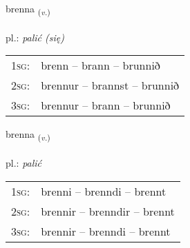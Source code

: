 \documentclass[frontgrid, backgrid]{flacards}\usepackage[]{graphicx}\usepackage[]{xcolor}
\begin{document}
\renewcommand{\flhead}{\vskip5pt \fboxsep=0pt {\small\bfseries\footnotesize Sagnorð | Verb}}
\renewcommand{\fcfoot}{\vskip5pt \fboxsep=0pt \hspace{2pt}{\small\bfseries\footnotesize 2K}}

\renewcommand{\blhead}{\vskip5pt {\small\bfseries\footnotesize Sagnorð | Verb }}
\renewcommand{\bcfoot}{\vskip5pt \hspace{2pt}{\small\bfseries\footnotesize 2K}}


{brenna \small{\textsubscript{(\textit{v.})}} \\[1ex] %
\textphonetic{[prɛna]} \\
pl.: \emph{palić (się)} \\  [2ex]
\renewcommand*{\arraystretch}{0.8}
\begin{tabular}{p{1cm}l}
\textsc{1sg}: & brenn -- brann -- brunnið \\ 
\textsc{2sg}: & brennur -- brannst -- brunnið \\ 
\textsc{3sg}: & brennur -- brann -- brunnið \\ 
\end{tabular}
}

\renewcommand{\flhead}{\vskip5pt \fboxsep=0pt {\small\bfseries\footnotesize Sagnorð | Verb}}
\renewcommand{\fcfoot}{\vskip5pt \fboxsep=0pt \hspace{2pt}{\small\bfseries\footnotesize 2K}}

\renewcommand{\blhead}{\vskip5pt {\small\bfseries\footnotesize Sagnorð | Verb }}
\renewcommand{\bcfoot}{\vskip5pt \hspace{2pt}{\small\bfseries\footnotesize 2K}}


{brenna \small{\textsubscript{(\textit{v.})}} \\[1ex] %
\textphonetic{[prɛna]} \\
pl.: \emph{palić} \\  [2ex]
\renewcommand*{\arraystretch}{0.8}
\begin{tabular}{p{1cm}l}
\textsc{1sg}: & brenni -- brenndi -- brennt \\ 
\textsc{2sg}: & brennir -- brenndir -- brennt \\ 
\textsc{3sg}: & brennir -- brenndi -- brennt \\ 
\end{tabular}
}
\end{document}
